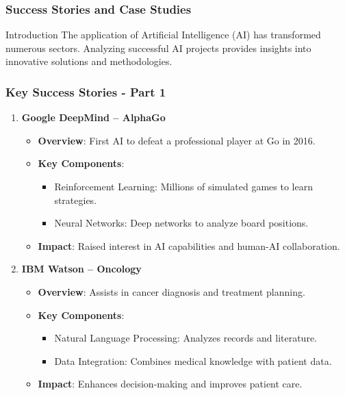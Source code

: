 \documentclass[aspectratio=169]{beamer}
\begin{document}
\begin{frame}[fragile]
    \frametitle{Success Stories and Case Studies}
    \begin{block}{Introduction}
        The application of Artificial Intelligence (AI) has transformed numerous sectors. Analyzing successful AI projects provides insights into innovative solutions and methodologies.
    \end{block}
\end{frame}

\begin{frame}[fragile]
    \frametitle{Key Success Stories - Part 1}
    \begin{enumerate}
        \item \textbf{Google DeepMind – AlphaGo}
        \begin{itemize}
            \item \textbf{Overview}: First AI to defeat a professional player at Go in 2016.
            \item \textbf{Key Components}:
            \begin{itemize}
                \item Reinforcement Learning: Millions of simulated games to learn strategies.
                \item Neural Networks: Deep networks to analyze board positions.
            \end{itemize}
            \item \textbf{Impact}: Raised interest in AI capabilities and human-AI collaboration.
        \end{itemize}
        
        \item \textbf{IBM Watson – Oncology}
        \begin{itemize}
            \item \textbf{Overview}: Assists in cancer diagnosis and treatment planning.
            \item \textbf{Key Components}:
            \begin{itemize}
                \item Natural Language Processing: Analyzes records and literature.
                \item Data Integration: Combines medical knowledge with patient data.
            \end{itemize}
            \item \textbf{Impact}: Enhances decision-making and improves patient care.
        \end{itemize}
    \end{enumerate}
\end{frame}
\end{document}
